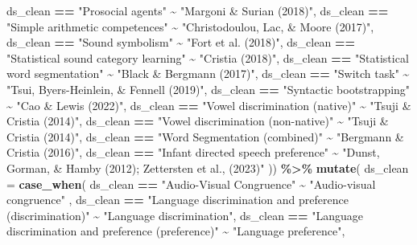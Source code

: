\documentclass[
]{article}
\newenvironment{Shaded}{\begin{snugshade}}{\end{snugshade}}
\newcommand{\AttributeTok}[1]{\textcolor[rgb]{0.13,0.29,0.53}{#1}}
\newcommand{\FunctionTok}[1]{\textcolor[rgb]{0.13,0.29,0.53}{\textbf{#1}}}
\newcommand{\NormalTok}[1]{#1}
\newcommand{\SpecialCharTok}[1]{\textcolor[rgb]{0.81,0.36,0.00}{\textbf{#1}}}
\newcommand{\StringTok}[1]{\textcolor[rgb]{0.31,0.60,0.02}{#1}}
\begin{document}
\begin{Shaded}
\begin{Highlighting}[]
\NormalTok{    ds\_clean }\SpecialCharTok{==} \StringTok{"Prosocial agents"} \SpecialCharTok{\textasciitilde{}} \StringTok{"Margoni \& Surian (2018)"}\NormalTok{, }
\NormalTok{    ds\_clean }\SpecialCharTok{==} \StringTok{"Simple arithmetic competences"} \SpecialCharTok{\textasciitilde{}} \StringTok{"Christodoulou, Lac, \& Moore (2017)"}\NormalTok{, }
\NormalTok{    ds\_clean }\SpecialCharTok{==} \StringTok{"Sound symbolism"} \SpecialCharTok{\textasciitilde{}} \StringTok{"Fort et al. (2018)"}\NormalTok{, }
\NormalTok{    ds\_clean }\SpecialCharTok{==} \StringTok{"Statistical sound category learning"} \SpecialCharTok{\textasciitilde{}} \StringTok{"Cristia (2018)"}\NormalTok{, }
\NormalTok{    ds\_clean }\SpecialCharTok{==} \StringTok{"Statistical word segmentation"} \SpecialCharTok{\textasciitilde{}} \StringTok{"Black \& Bergmann (2017)"}\NormalTok{, }
\NormalTok{    ds\_clean }\SpecialCharTok{==} \StringTok{"Switch task"} \SpecialCharTok{\textasciitilde{}} \StringTok{"Tsui, Byers{-}Heinlein, \& Fennell (2019)"}\NormalTok{, }
\NormalTok{    ds\_clean }\SpecialCharTok{==} \StringTok{"Syntactic bootstrapping"} \SpecialCharTok{\textasciitilde{}} \StringTok{"Cao \& Lewis (2022)"}\NormalTok{, }
\NormalTok{    ds\_clean }\SpecialCharTok{==} \StringTok{"Vowel discrimination (native)"} \SpecialCharTok{\textasciitilde{}} \StringTok{"Tsuji \& Cristia (2014)"}\NormalTok{, }
\NormalTok{    ds\_clean }\SpecialCharTok{==} \StringTok{"Vowel discrimination (non{-}native)"} \SpecialCharTok{\textasciitilde{}} \StringTok{"Tsuji \& Cristia (2014)"}\NormalTok{, }
\NormalTok{    ds\_clean }\SpecialCharTok{==} \StringTok{"Word Segmentation (combined)"} \SpecialCharTok{\textasciitilde{}} \StringTok{"Bergmann \& Cristia (2016)"}\NormalTok{, }
\NormalTok{    ds\_clean }\SpecialCharTok{==} \StringTok{"Infant directed speech preference"} \SpecialCharTok{\textasciitilde{}} \StringTok{"Dunst, Gorman, \& Hamby (2012); Zettersten et al., (2023)"}
\NormalTok{  )) }\SpecialCharTok{\%\textgreater{}\%} 
  \FunctionTok{mutate}\NormalTok{(}
    \AttributeTok{ds\_clean =} \FunctionTok{case\_when}\NormalTok{(}
\NormalTok{      ds\_clean }\SpecialCharTok{==} \StringTok{"Audio{-}Visual Congruence"} \SpecialCharTok{\textasciitilde{}} \StringTok{"Audio{-}visual congruence"}\NormalTok{ , }
\NormalTok{      ds\_clean }\SpecialCharTok{==} \StringTok{"Language discrimination and preference (discrimination)"} \SpecialCharTok{\textasciitilde{}} \StringTok{"Language discrimination"}\NormalTok{, }
\NormalTok{      ds\_clean }\SpecialCharTok{==} \StringTok{"Language discrimination and preference (preference)"} \SpecialCharTok{\textasciitilde{}} \StringTok{"Language preference"}\NormalTok{,}

\end{Highlighting}
\end{Shaded}
\end{document}
